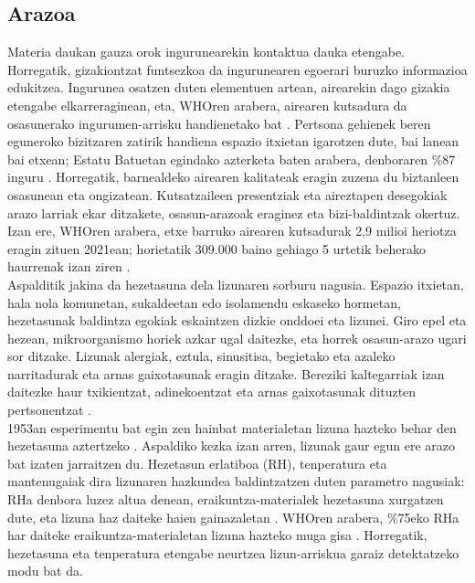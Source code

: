 \documentclass[10pt]{article}
\newcommand{\acpar}[1]{(\acs{#1})\acused{#1}}
\begin{document}
\subsection{Arazoa}
\label{sec:arazoa}
Materia daukan gauza orok ingurunearekin kontaktua dauka etengabe. Horregatik, gizakiontzat funtsezkoa da ingurunearen egoerari buruzko informazioa edukitzea. Ingurunea osatzen duten elementuen artean, airearekin dago gizakia etengabe elkarreraginean, eta, \ac{WHO}ren arabera, airearen kutsadura da osasunerako ingurumen-arrisku handienetako bat \cite{who_aqg2021}. Pertsona gehienek beren eguneroko bizitzaren zatirik handiena espazio itxietan igarotzen dute, bai lanean bai etxean; Estatu Batuetan egindako azterketa baten arabera, denboraren \%87 inguru \cite{Klepeis2001}. Horregatik, barnealdeko airearen kalitateak eragin zuzena du biztanleen osasunean eta ongizatean. Kutsatzaileen presentziak eta aireztapen desegokiak arazo larriak ekar ditzakete, osasun-arazoak eraginez eta bizi-baldintzak okertuz. Izan ere, \ac{WHO}ren arabera, etxe barruko airearen kutsadurak 2,9 milioi heriotza eragin zituen 2021ean; horietatik 309.000 baino gehiago 5 urtetik beherako haurrenak izan ziren \cite{who_household,qiu2022lung}.\\

Aspalditik jakina da hezetasuna dela lizunaren sorburu nagusia. Espazio itxietan, hala nola komunetan, sukaldeetan edo isolamendu eskaseko hormetan, hezetasunak baldintza egokiak eskaintzen dizkie onddoei eta lizunei. Giro epel eta hezean, mikroorganismo horiek azkar ugal daitezke, eta horrek osasun-arazo ugari sor ditzake. Lizunak alergiak, eztula, sinusitisa, begietako eta azaleko narritadurak eta arnas gaixotasunak eragin ditzake. Bereziki kaltegarriak izan daitezke haur txikientzat, adinekoentzat eta arnas gaixotasunak dituzten pertsonentzat \cite{WHO2009}.\\

1953an esperimentu bat egin zen hainbat materialetan lizuna hazteko behar den hezetasuna aztertzeko \cite{block1953humidity}. Aspaldiko kezka izan arren, lizunak gaur egun ere arazo bat izaten jarraitzen du. Hezetasun erlatiboa \acpar{RH}, tenperatura eta mantenugaiak dira lizunaren hazkundea baldintzatzen duten parametro nagusiak: \ac{RH}a denbora luzez altua denean, eraikuntza-materialek hezetasuna xurgatzen dute, eta lizuna haz daiteke haien gainazaletan \cite{block1953humidity,WHO2009}. \ac{WHO}ren arabera, \%75eko \ac{RH}a har daiteke eraikuntza-materialetan lizuna hazteko muga gisa \cite{WHO2009}. Horregatik, hezetasuna eta tenperatura etengabe neurtzea lizun-arriskua garaiz detektatzeko modu bat da.\\
\end{document}
